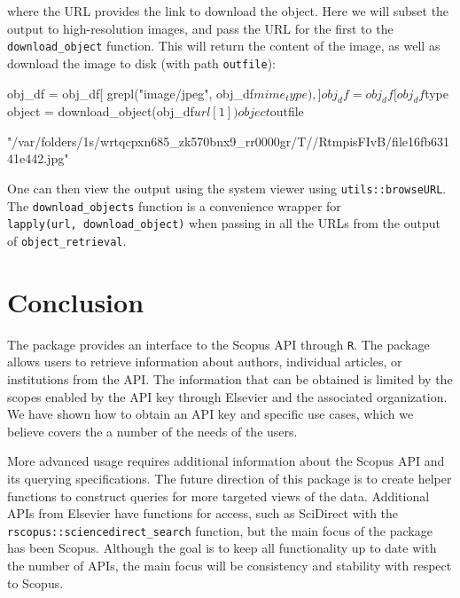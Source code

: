 where the URL provides the link to download the object. Here we will
subset the output to high-resolution images, and pass the URL for the
first to the \texttt{download\_object} function. This will return the
content of the image, as well as download the image to disk (with path
\texttt{outfile}):

\begin{Schunk}
\begin{Sinput}
obj_df = obj_df[ grepl("image/jpeg", obj_df$mime_type),]
obj_df = obj_df[ obj_df$type %in% "IMAGE-HIGH-RES",]
object = download_object(obj_df$url[1])
object$outfile
\end{Sinput}
\begin{Soutput}
[1] "/var/folders/1s/wrtqcpxn685_zk570bnx9_rr0000gr/T//RtmpisFIvB/file16fb63141e442.jpg"
\end{Soutput}
\end{Schunk}

One can then view the output using the system viewer using
\texttt{utils::browseURL}. The \texttt{download\_objects} function is a
convenience wrapper for \texttt{lapply(url,\ download\_object)} when
passing in all the URLs from the output of \texttt{object\_retrieval}.

\hypertarget{conclusion}{%
\section{Conclusion}\label{conclusion}}

The  package provides an interface to the Scopus API
through \texttt{R}. The package allows users to retrieve information
about authors, individual articles, or institutions from the API. The
information that can be obtained is limited by the scopes enabled by the
API key through Elsevier and the associated organization. We have shown
how to obtain an API key and specific use cases, which we believe covers
the a number of the needs of the users.

More advanced usage requires additional information about the Scopus API
and its querying specifications. The future direction of this package is
to create helper functions to construct queries for more targeted views
of the data. Additional APIs from Elsevier have functions for access,
such as SciDirect with the \texttt{rscopus::sciencedirect\_search}
function, but the main focus of the package has been Scopus. Although
the goal is to keep all functionality up to date with the number of
APIs, the main focus will be consistency and stability with respect to
Scopus.

